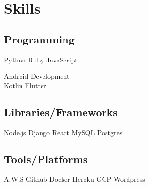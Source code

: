 \documentclass[]{plushcv}
\begin{document}

%
%

\hfill



\section{Skills}

\begin{multicols}{3}

\subsection{Programming}
Python \textbullet{} Ruby \textbullet{} JavaScript

Android Development \\ Kotlin \textbullet{} Flutter
\columnbreak

\subsection{Libraries/Frameworks}
{Node.js \textbullet{} Django \textbullet{}  React \textbullet{} MySQL \textbullet{} Postgres }

\columnbreak

\subsection{Tools/Platforms}
A.W.S \textbullet{} Github \textbullet{} Docker \textbullet{} Heroku \textbullet{} GCP \textbullet{} Wordpress
\end{multicols}
\end{document}

